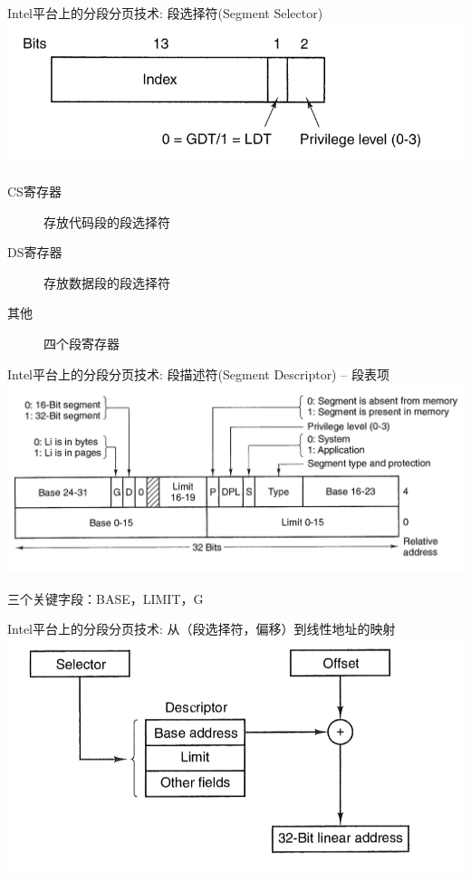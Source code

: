 \documentclass[xcolor=svgnames]{beamer}
\begin{document}
\begin{CJK*}{UTF8}{gbsn}
\begin{frame}{Intel平台上的分段分页技术: 段选择符(Segment Selector)}
\includegraphics[width=1.0\textwidth]{selector.png}

\begin{description}
\item[CS寄存器] 存放代码段的段选择符
\item[DS寄存器] 存放数据段的段选择符
\item[其他] 四个段寄存器
\end{description}
\end{frame}

\begin{frame}{Intel平台上的分段分页技术: 段描述符(Segment Descriptor) -- 段表项}
\includegraphics[width=1.0\textwidth]{descriptor.png}

三个关键字段：BASE，LIMIT，G
\end{frame}

\begin{frame}{Intel平台上的分段分页技术: 从（段选择符，偏移）到线性地址的映射}
\includegraphics[width=1.0\textwidth]{smap.png}
\end{frame}


\end{CJK*}
\end{document}
